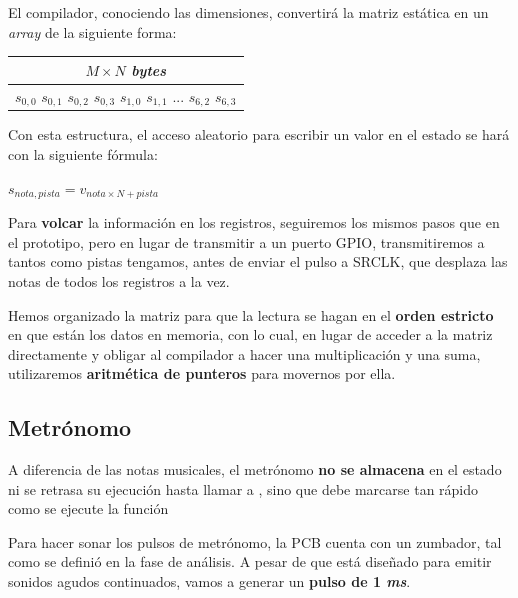 \smallskip

El compilador, conociendo las dimensiones, convertirá la matriz estática en un \textit{array} de la siguiente forma:

\smallskip

\begin{center}
	\begin{tabular}{|c|}
		\hline $M\times N$ \textit{bytes} \\
		\hline $s_{0,0}$ $s_{0,1}$ $s_{0,2}$ $s_{0,3}$ $s_{1,0}$ $s_{1,1}$ ... $s_{6,2}$  $s_{6,3}$ \\
		\hline 
	\end{tabular}
	\smallskip
\end{center}

\smallskip

Con esta estructura, el acceso aleatorio para escribir un valor en el estado se hará con la siguiente fórmula:

\begin{center}
	$s_{nota,pista} = v_{nota \times N + pista}$
\end{center}

Para \textbf{volcar} la información en los registros, seguiremos los mismos pasos que en el prototipo, pero en lugar de transmitir a un puerto \acrshort{GPIO}, transmitiremos a tantos como pistas tengamos, antes de enviar el pulso a SRCLK, que desplaza las notas de todos los registros a la vez.

Hemos organizado la matriz para que la lectura se hagan en el \textbf{orden estricto} en que están los datos en memoria, con lo cual, en lugar de acceder a la matriz directamente y obligar al compilador a hacer una multiplicación y una suma, utilizaremos \textbf{aritmética de punteros} para movernos por ella.

\subsection{Metrónomo}

A diferencia de las notas musicales, el metrónomo \textbf{no se almacena} en el estado ni se retrasa su ejecución hasta llamar a , sino que debe marcarse tan rápido como se ejecute la función 

Para hacer sonar los pulsos de metrónomo, la \acrshort{PCB} cuenta con un zumbador, tal como se definió en la fase de análisis. A pesar de que está diseñado para emitir sonidos agudos continuados, vamos a generar un \textbf{pulso de 1 \textit{ms}}.

